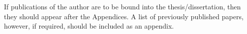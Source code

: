 
\begin{justify}
    If publications of the author are to be bound into the thesis/dissertation, then they should appear after the Appendices.  A list of previously published papers, however, if required, should be included as an appendix.
\end{justify}